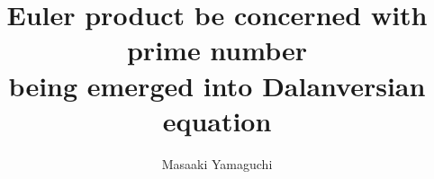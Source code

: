 \documentclass{jsarticle}
\begin{document}
\title{Euler product be concerned with prime number \\
being emerged into Dalanversian equation}
\author{Masaaki Yamaguchi}
\date{}
\maketitle
   \newcommand{\variint}{%
	\begin{picture}(15,30)
		\put(0,0){
			$ \iint $}
		\put(0,5){\line(15,0){15}}
	\end{picture} %
}

\newcommand{\variiint}{%
	\begin{picture}(15,15)
		\put(0,0){
			$ \iiint $}
		\put(0,5){\line(15,0){20}}
	\end{picture} %
}



 \newcommand{\alearletter}{%
	 \begin{picture}(10,20)
		 \put(0,0){
			 $ \square $}
		 \put(0,0){\line(1,1){10}}
	 \end{picture} %
	 }

 \newcommand{\secproduct}{%
	 \begin{picture}(10,20)
		 \put(0,0){
			 $ \nabla $}
		 \put(5,0){+}
	 \end{picture} %
	 }
 \newcommand{\talot}{%
	 \begin{picture}(15,20)
		 \put(0,0){
			 $ \text{\scalebox{2.0}[2]{$\nabla$}}$}
		 \put(5,3){
			 $ \Delta $}
	 \end{picture} %
	 }
 \newcommand{\hazerdnabla}{%
	 \begin{picture}(15,20)
		 \put(0,0){
			 $ \text{\scalebox{2.0}[2]{$\nabla$}}$}
		 \put(5,3){
			 $\text{Y}  $}
	 \end{picture} %
	 }

 \newcommand{\securebox}{%
	 \begin{picture}(15,20)
		 \put(0,0){
			 $ \text{\scalebox{2.0}[2]{$\square$}}$}
		 \put(5,3){
			 $\text{Y}  $}
	 \end{picture} %
	 }


\newcommand{\timebow}{%
	\begin{picture}(5,5)
		\put(0,0){$\text{\rotatebox{90}{$\bowtie$}}$}
	\end{picture} %
	}


 \newcommand{\flowerletter}{%
	 \begin{picture}(10,20)
		 \put(0,0){$\text{\scalebox{1.0}[1]{$\square$}}$}
		 \put(0,0){$\text{\scalebox{1.0}[2]{$\int$}}$}
	 \end{picture} %
	 }
\newcommand{\squareiint}{%
	\begin{picture}(15,30)
		\put(0,0){
			$ \iint $}
		\put(0,5){$\text{\scalebox{2.0}[1]{$\square$}}$}
	\end{picture} %
}
\end{document}
